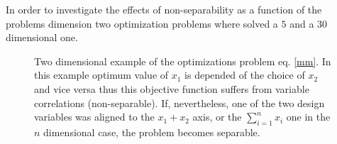 In order to investigate the effects of non-separability as a function of the problems dimension two optimization problems where solved a $5$ and a $30$ dimensional one.  
\begin{figure}[h!]
\begin{minipage}[b]{0.5\linewidth}
 \centering
\end{minipage}
\begin{minipage}[b]{0.5\linewidth}
 \centering
\end{minipage}
\caption{Two dimensional example of the optimizations problem eq. \ref{mm}. In this example optimum value of $x_1$ is depended of the choice of $x_2$ and vice versa thus this objective function suffers from variable correlations (non-separable). If, nevertheless, one of the two design variables was aligned to the $x_1+x_2$ axis, or the $\sum^{n}_{i=1}x_i$ one in the $n$ dimensional case, the problem becomes separable.} 

\label{multimod}
\end{figure}


